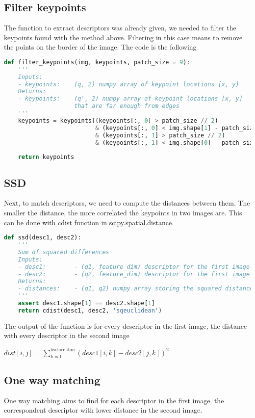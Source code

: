 \documentclass{ETHExercise}
\begin{document}
\subsection{Filter keypoints}
The function to extract descriptors was already given, we needed to filter the keypoints 
found with the method above. Filtering in this case means to remove the points on the border of the image.
The code is the following
\begin{lstlisting}[language=Python, caption=filter keypoints]
  def filter_keypoints(img, keypoints, patch_size = 9):
    '''
    Inputs:
    - keypoints:    (q, 2) numpy array of keypoint locations [x, y]
    Returns:
    - keypoints:    (q', 2) numpy array of keypoint locations [x, y] 
                    that are far enough from edges
    '''
    keypoints = keypoints[(keypoints[:, 0] > patch_size // 2) 
                          & (keypoints[:, 0] < img.shape[1] - patch_size // 2) 
                          & (keypoints[:, 1] > patch_size // 2) 
                          & (keypoints[:, 1] < img.shape[0] - patch_size // 2)]
    
    return keypoints
\end{lstlisting}
\subsection{SSD}
Next, to match descriptors, we need to compute the distances between them.
The smaller the distance, the more correlated the keypoints in two images are.
This can be done with cdist function in scipy.spatial.distance. 
\begin{lstlisting}[language=Python, caption=SSD]
def ssd(desc1, desc2):
    '''
    Sum of squared differences
    Inputs:
    - desc1:        - (q1, feature_dim) descriptor for the first image
    - desc2:        - (q2, feature_dim) descriptor for the first image
    Returns:
    - distances:    - (q1, q2) numpy array storing the squared distance
    '''
    assert desc1.shape[1] == desc2.shape[1]
    return cdist(desc1, desc2, 'sqeuclidean')
  \end{lstlisting}

  The output of the function is for every descriptor in the first image,
  the distance with every descriptor in the second image
  \begin{center}
    $dist[i,j] = \sum\limits_{k = 1}^{\text{feature\_dim}} (desc1[i, k] - desc2[j, k])^2$
  \end{center}

\subsection{One way matching}
One way matching aims to find for each descriptor in the first image, the correspondent 
descriptor with lower distance in the second image.
\end{document}
